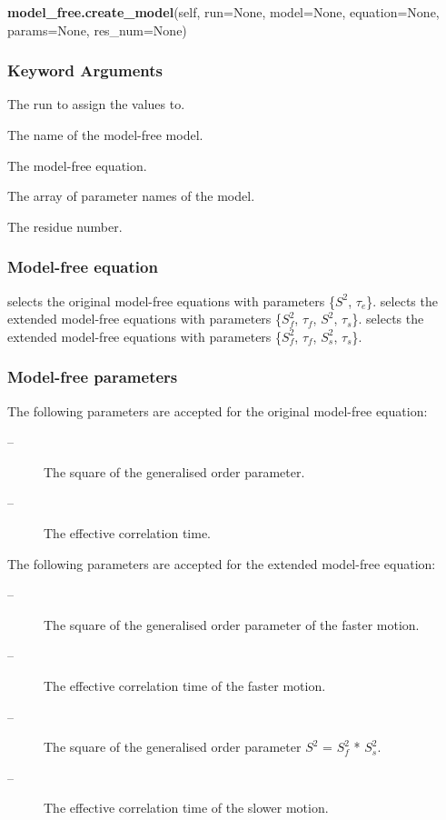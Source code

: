  \textsf{\textbf{model\_free.create\_model}(self, run=None, model=None, equation=None, params=None, res\_num=None)} 

  
 \subsubsection{Keyword Arguments} 

   The run to assign the values to.   

   The name of the model-free model.   

   The model-free equation.   

   The array of parameter names of the model.   

   The residue number.  

  

  
 \subsubsection{Model-free equation} 

  selects the original model-free equations with parameters \{$S^2$, $\tau_e$\}.  selects the extended model-free equations with parameters \{$S^2_f$, $\tau_f$, $S^2$, $\tau_s$\}.  selects the extended model-free equations with parameters \{$S^2_f$, $\tau_f$, $S^2_s$, $\tau_s$\}. 
  

  
 \subsubsection{Model-free parameters} 

 The following parameters are accepted for the original model-free equation: 
  

 \begin{description} 
 \item[ --]   The square of the generalised order parameter.  
 \item[ --]   The effective correlation time.  
 \end{description} 
  

 The following parameters are accepted for the extended model-free equation: 
  

 \begin{description} 
 \item[ --]  The square of the generalised order parameter of the faster motion.  
 \item[ --]   The effective correlation time of the faster motion.  
 \item[ --]   The square of the generalised order parameter $S^2$ = $S^2_f$ * $S^2_s$.  
 \item[ --]   The effective correlation time of the slower motion.  
 \end{description} 
  

